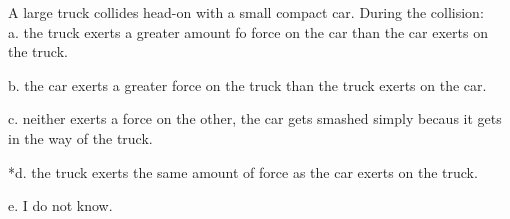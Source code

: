 
A large truck collides head-on with a small compact car. During the collision: \\

a. the truck exerts a greater amount fo force on the car than the car exerts on the truck.

b. the car exerts a greater force on the truck than the truck exerts on the car.

c. neither exerts a force on the other, the car gets smashed simply becaus it gets in the way of the truck.

*d. the truck exerts the same amount of force as the car exerts on the truck.

e. I do not know. \\
